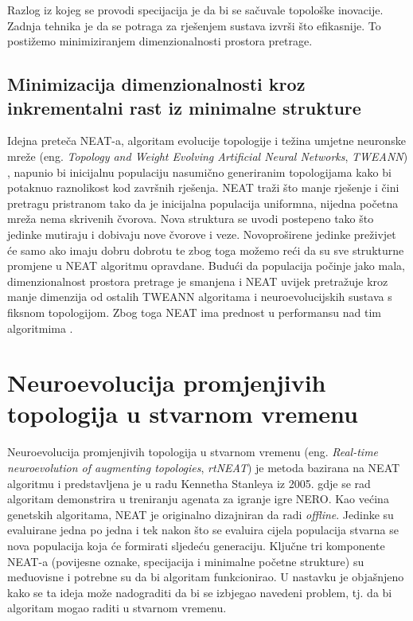\documentclass[times, utf8, seminar, numeric]{fer}
\begin{document}
Razlog iz kojeg se provodi specijacija je da bi se sačuvale topološke inovacije. Zadnja tehnika je da se potraga za rješenjem sustava izvrši što efikasnije. To postižemo minimiziranjem dimenzionalnosti prostora pretrage.

\section{Minimizacija dimenzionalnosti kroz inkrementalni rast iz minimalne strukture}
Idejna preteča NEAT-a, algoritam evolucije topologije i težina umjetne neuronske mreže (eng. \textit{Topology and Weight Evolving Artificial Neural Networks}, \textit{TWEANN}) \citep{rad3}, napunio bi inicijalnu populaciju nasumično generiranim topologijama kako bi potaknuo raznolikost kod završnih rješenja. NEAT traži što manje rješenje i čini pretragu pristranom tako da je inicijalna populacija uniformna, nijedna početna mreža nema skrivenih čvorova. Nova struktura se uvodi postepeno tako što jedinke mutiraju i dobivaju nove čvorove i veze. Novoproširene jedinke preživjet će samo ako imaju dobru dobrotu te zbog toga možemo reći da su sve strukturne promjene u NEAT algoritmu opravdane. Budući da populacija počinje jako mala, dimenzionalnost prostora pretrage je smanjena i NEAT uvijek pretražuje kroz manje dimenzija od ostalih TWEANN algoritama i neuroevolucijskih sustava s fiksnom topologijom. Zbog toga NEAT ima prednost u performansu nad tim algoritmima \citep{rad2}.

\chapter{Neuroevolucija promjenjivih topologija u stvarnom vremenu}
Neuroevolucija promjenjivih topologija u stvarnom vremenu (eng. \textit{Real-time neuroevolution of augmenting topologies}, \textit{rtNEAT}) je metoda bazirana na NEAT algoritmu i predstavljena je u radu Kennetha Stanleya iz 2005. \citep{rad4} gdje se rad algoritam demonstrira u treniranju agenata za igranje igre NERO. Kao većina genetskih algoritama, NEAT je originalno dizajniran da radi \textit{offline}. Jedinke su evaluirane jedna po jedna i tek nakon što se evaluira cijela populacija stvarna se nova populacija koja će formirati sljedeću generaciju. Ključne tri komponente NEAT-a (povijesne oznake, specijacija i minimalne početne strukture) su međuovisne i potrebne su da bi algoritam funkcionirao. U nastavku je objašnjeno kako se ta ideja može nadograditi da bi se izbjegao navedeni problem, tj. da bi algoritam mogao raditi u stvarnom vremenu.
\end{document}
